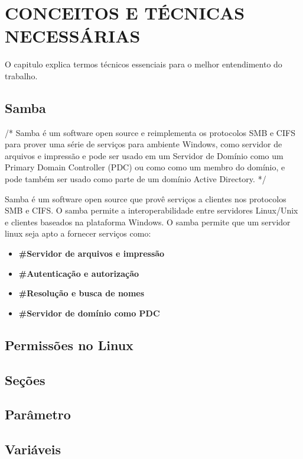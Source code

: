 \chapter{CONCEITOS E TÉCNICAS NECESSÁRIAS}

O capitulo explica termos técnicos essenciais para o melhor entendimento do trabalho.

\section{Samba}

/* Samba é um software open source e reimplementa os protocolos SMB e CIFS para prover
uma série de serviços para ambiente Windows, como servidor de arquivos e impressão e pode
ser usado em um Servidor de Domínio como um Primary Domain Controller (PDC) ou como
como um membro do domínio, e pode também ser usado como parte de um domínio Active
Directory. */

Samba é um software open source que provê serviços a clientes nos protocolos SMB e CIFS.
O samba permite a interoperabilidade entre servidores Linux/Unix e clientes baseados na
plataforma Windows.
O samba permite que um servidor linux seja apto a fornecer serviços como:
  \begin{itemize}
    \item \textbf{\#Servidor de arquivos e impressão}
    \item \textbf{\#Autenticação e autorização}
    \item \textbf{\#Resolução e busca de nomes}
    \item \textbf{\#Servidor de domínio como PDC}
  \end{itemize}

\section{Permissões no Linux}

\section{Seções}

\section{Parâmetro}

\section{Variáveis}

